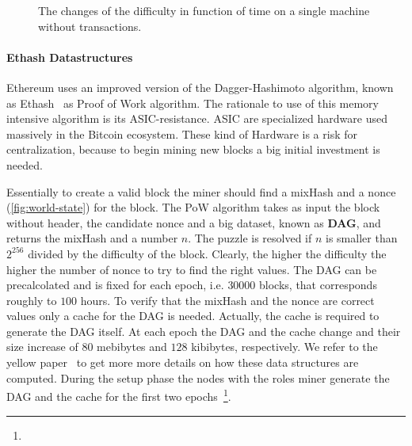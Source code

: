 \begin{figure}
\begin{center}
	\caption{The changes of the difficulty in function of time on 
	a single machine without transactions.}
	\label{fig:start_difficulty}
	
	\end{center}
\end{figure}

\paragraph{Ethash Datastructures} Ethereum uses an improved version of the
Dagger-Hashimoto algorithm, known as 
Ethash~\cite[Appendix J]{wood2018ethereum} as Proof of Work algorithm.
The rationale to use of this memory intensive algorithm is its 
ASIC-resistance. ASIC are specialized hardware used massively in the Bitcoin
ecosystem. These kind of Hardware is a risk for centralization, 
because to begin mining new blocks a big initial investment is needed.

Essentially to create a valid block the miner should find a mixHash and
a nonce (\autoref{fig:world-state}) for the block.
The PoW algorithm takes as input the block without header, the candidate
nonce and a big dataset, known as \textbf{DAG}, and
returns the mixHash and a number $n$. The puzzle is resolved if
$n$ is smaller than $2^{256}$ divided by the difficulty of the block. Clearly,
the higher the difficulty the higher the number of nonce to try to find the
right values. The DAG can be precalcolated and is fixed for each epoch, i.e.
$30000$ blocks, that corresponds roughly to $100$ hours. To verify
that the mixHash and the nonce are correct values only a cache for the
DAG is needed. Actually, the cache is required to generate the DAG itself.
At each epoch the DAG and the cache change and their size increase of
$80$ mebibytes and $128$ kibibytes, respectively.
We refer to the yellow paper~\cite[Appendix J]{wood2018ethereum} to get more
more details on how these data structures are computed.
During the setup phase the nodes with the roles miner generate the 
DAG and the cache for the first two epochs~\footnote{}.





